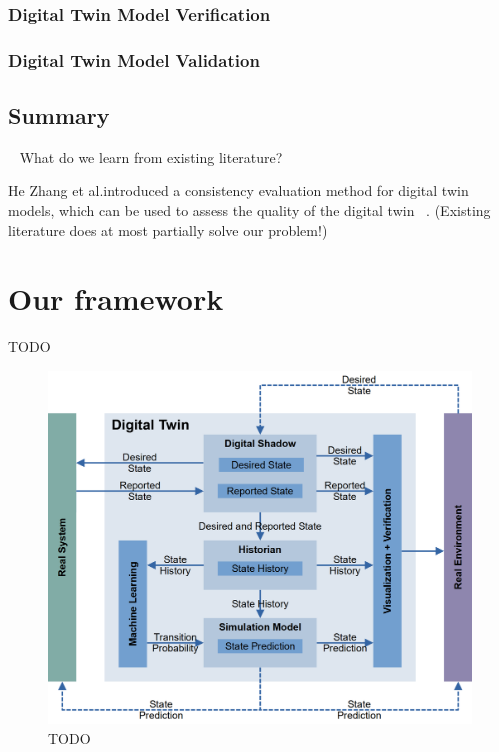 \documentclass[9pt,conference]{IEEEtran}
\begin{document}
    \subsubsection*{Digital Twin Model Verification}
    \label{subsection:DigitalTwinVerification}

    \subsubsection*{Digital Twin Model Validation}
    \label{subsection:DigitalTwinValidation}

    \subsection{Summary}~\label{section:liteature_summary}
    What do we learn from existing literature?

    He Zhang et al.introduced a consistency evaluation method for digital twin models, which can be used to assess the quality of the digital twin ~\cite{Jones2020}.
    (Existing literature does at most partially solve our problem!)

    \section{Our framework}
    \label{section:framework_1}
    TODO

    \begin{figure}[htbp]
        \includegraphics[width=\columnwidth]{Digital Twin.png}
        \caption{TODO}
        \label{todo-1}
    \end{figure}
\end{document}
